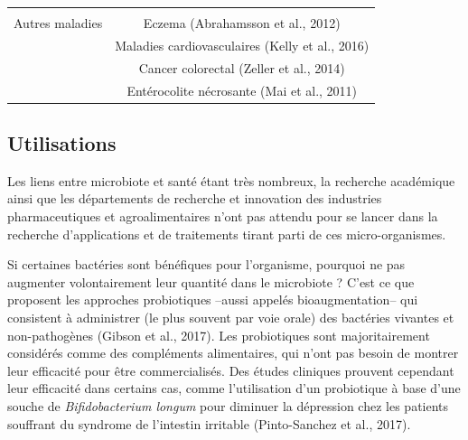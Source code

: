 \documentclass[12pt,a4paper]{reedthesis}
\theoremstyle{definition}
\theoremstyle{definition}
\theoremstyle{definition}
\theoremstyle{remark}
\begin{document}
\begin{longtable}[]{@{}cc@{}}
\begin{minipage}[t]{0.63\columnwidth}
\end{minipage}\tabularnewline
\begin{minipage}[t]{0.31\columnwidth}\centering
Autres maladies\strut
\end{minipage} & \begin{minipage}[t]{0.63\columnwidth}\centering
Eczema (Abrahamsson et al., 2012)\strut
\end{minipage}\tabularnewline
\begin{minipage}[t]{0.31\columnwidth}\centering
\strut
\end{minipage} & \begin{minipage}[t]{0.63\columnwidth}\centering
Maladies cardiovasculaires (Kelly et al., 2016)\strut
\end{minipage}\tabularnewline
\begin{minipage}[t]{0.31\columnwidth}\centering
\strut
\end{minipage} & \begin{minipage}[t]{0.63\columnwidth}\centering
Cancer colorectal (Zeller et al., 2014)\strut
\end{minipage}\tabularnewline
\begin{minipage}[t]{0.31\columnwidth}\centering
\strut
\end{minipage} & \begin{minipage}[t]{0.63\columnwidth}\centering
Entérocolite nécrosante (Mai et al., 2011)\strut
\end{minipage}\tabularnewline
\bottomrule
\end{longtable}
\hypertarget{utilisations}{%
\subsection{Utilisations}\label{utilisations}}

Les liens entre microbiote et santé étant très nombreux, la recherche académique ainsi que les départements de recherche et innovation des industries pharmaceutiques et agroalimentaires n'ont pas attendu pour se lancer dans la recherche d'applications et de traitements tirant parti de ces micro-organismes.

Si certaines bactéries sont bénéfiques pour l'organisme, pourquoi ne pas augmenter volontairement leur quantité dans le microbiote ? C'est ce que proposent les approches probiotiques --aussi appelés bioaugmentation-- qui consistent à administrer (le plus souvent par voie orale) des bactéries vivantes et non-pathogènes (Gibson et al., 2017). Les probiotiques sont majoritairement considérés comme des compléments alimentaires, qui n'ont pas besoin de montrer leur efficacité pour être commercialisés. Des études cliniques prouvent cependant leur efficacité dans certains cas, comme l'utilisation d'un probiotique à base d'une souche de \emph{Bifidobacterium longum} pour diminuer la dépression chez les patients souffrant du syndrome de l'intestin irritable (Pinto-Sanchez et al., 2017).
\end{document}
